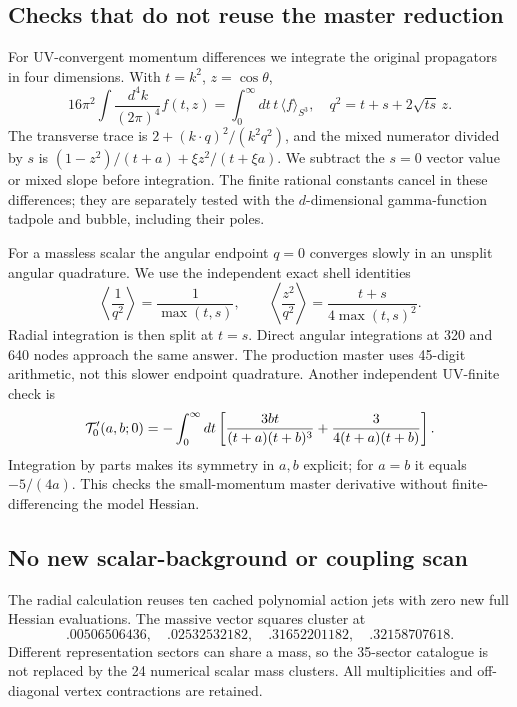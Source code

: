 \documentclass[11pt]{article}
\begin{document}
\subsection{Checks that do not reuse the master reduction}
For UV-convergent momentum differences we integrate the original
propagators in four dimensions. With $t=k^2$, $z=\cos\theta$,
\begin{equation}
 16\pi^2\int\frac{d^4k}{(2\pi)^4}f(t,z)
 =\int_0^\infty dt\,t\,\langle f\rangle_{S^3},\quad
 q^2=t+s+2\sqrt{ts}\,z.
\end{equation}
The transverse trace is $2+(k\cdot q)^2/(k^2q^2)$, and the mixed
numerator divided by $s$ is
$(1-z^2)/(t+a)+\xi z^2/(t+\xi a)$.
We subtract the $s=0$ vector value or mixed slope before integration.
The finite rational constants cancel in these differences; they are
separately tested with the $d$-dimensional gamma-function tadpole and
bubble, including their poles.

For a massless scalar the angular endpoint $q=0$ converges slowly in
an unsplit angular quadrature. We use the independent exact shell identities
\begin{equation}
 \left\langle\frac1{q^2}\right\rangle=\frac1{\max(t,s)},\qquad
 \left\langle\frac{z^2}{q^2}\right\rangle
       =\frac{t+s}{4\max(t,s)^2}.
\end{equation}
Radial integration is then split at $t=s$. Direct angular integrations
at 320 and 640 nodes approach the same answer. The production master
uses 45-digit arithmetic, not this slower endpoint quadrature.
Another independent UV-finite check is
\begin{equation}
 {\cal T}'_0(a,b;0)
 =-\int_0^\infty dt\left[
 \frac{3bt}{(t+a)(t+b)^3}
       +\frac{3}{4(t+a)(t+b)}\right].
\end{equation}
Integration by parts makes its symmetry in $a,b$ explicit; for $a=b$
it equals $-5/(4a)$. This checks the small-momentum master derivative
without finite-differencing the model Hessian.

\subsection{No new scalar-background or coupling scan}
The radial calculation reuses ten cached polynomial action jets with
zero new full Hessian evaluations. The massive vector squares cluster at
\begin{equation}
 .00506506436,\quad .02532532182,\quad
 .31652201182,\quad .32158707618.
\end{equation}
Different representation sectors can share a mass, so the 35-sector
catalogue is not replaced by the 24 numerical scalar mass clusters.
All multiplicities and off-diagonal vertex contractions are retained.
\end{document}
